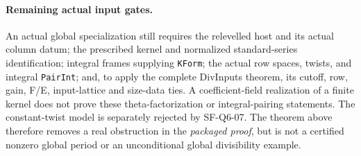 \paragraph{Remaining actual input gates.}
An actual global specialization still requires the relevelled host
and its actual column datum; the prescribed kernel and normalized
standard-series identification; integral frames supplying
\texttt{KForm}; the actual row spaces, twists, and integral
\texttt{PairInt}; and, to apply the complete DivInputs theorem,
its cutoff, row, gain, F/E, input-lattice and size-data ties.
A coefficient-field realization of a finite kernel does not prove
these theta-factorization or integral-pairing statements.
The constant-twist model is separately rejected by SF-Q6-07.
The theorem above therefore removes a real obstruction in the
\emph{packaged proof}, but is not a certified nonzero global period
or an unconditional global divisibility example.

